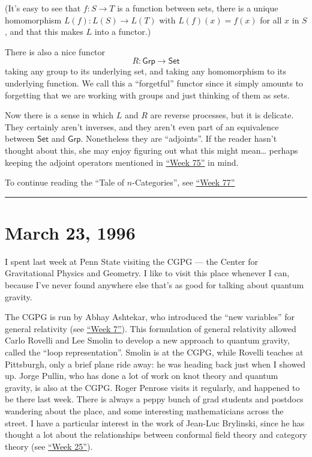 \documentclass{article}
\begin{document}
(It's easy to see that \(f\colon S\to T\) is a function between sets,
there is a unique homomorphism \(L(f)\colon L(S)\to L(T)\) with
\(L(f)(x) = f(x)\) for all \(x\) in \(S\), and that this makes \(L\)
into a functor.)

There is also a nice functor \[R\colon\mathsf{Grp}\to\mathsf{Set}\]
taking any group to its underlying set, and taking any homomorphism to
its underlying function. We call this a ``forgetful'' functor since it
simply amounts to forgetting that we are working with groups and just
thinking of them as sets.

Now there is a sense in which \(L\) and \(R\) are reverse processes, but
it is delicate. They certainly aren't inverses, and they aren't even
part of an equivalence between \(\mathsf{Set}\) and \(\mathsf{Grp}\).
Nonetheless they are ``adjoints''. If the reader hasn't thought about
this, she may enjoy figuring out what this might mean\ldots{} perhaps
keeping the adjoint operators mentioned in
\protect\hyperlink{week75}{``Week 75''} in mind.

To continue reading the ``Tale of \(n\)-Categories'', see
\protect\hyperlink{week77}{``Week 77''}

\begin{center}\rule{0.5\linewidth}{0.5pt}\end{center}
\hypertarget{week77}{%
\section{March 23, 1996}\label{week77}}

I spent last week at Penn State visiting the CGPG --- the Center for
Gravitational Physics and Geometry. I like to visit this place whenever
I can, because I've never found anywhere else that's as good for talking
about quantum gravity.

The CGPG is run by Abhay Ashtekar, who introduced the ``new variables''
for general relativity (see \protect\hyperlink{week7}{``Week 7''}). This
formulation of general relativity allowed Carlo Rovelli and Lee Smolin
to develop a new approach to quantum gravity, called the ``loop
representation''. Smolin is at the CGPG, while Rovelli teaches at
Pittsburgh, only a brief plane ride away: he was heading back just when
I showed up. Jorge Pullin, who has done a lot of work on knot theory and
quantum gravity, is also at the CGPG. Roger Penrose visits it regularly,
and happened to be there last week. There is always a peppy bunch of
grad students and postdocs wandering about the place, and some
interesting mathematicians across the street. I have a particular
interest in the work of Jean-Luc Brylinski, since he has thought a lot
about the relationships between conformal field theory and category
theory (see \protect\hyperlink{week25}{``Week 25''}).
\end{document}
